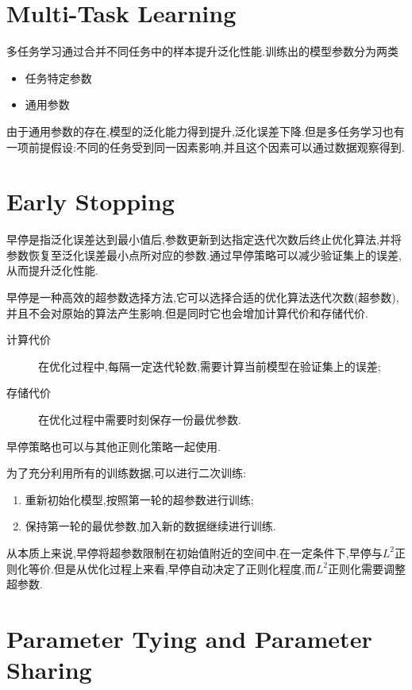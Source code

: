 \section{Multi-Task Learning}

多任务学习通过合并不同任务中的样本提升泛化性能.训练出的模型参数分为两类
\begin{itemize}
    \item 任务特定参数
    \item 通用参数
\end{itemize}

由于通用参数的存在,模型的泛化能力得到提升,泛化误差下降.但是多任务学习也有一项前提假设:不同的任务受到同一因素影响,并且这个因素可以通过数据观察得到.

\section{Early Stopping}

早停是指泛化误差达到最小值后,参数更新到达指定迭代次数后终止优化算法,并将参数恢复至泛化误差最小点所对应的参数.通过早停策略可以减少验证集上的误差,从而提升泛化性能.

早停是一种高效的超参数选择方法,它可以选择合适的优化算法迭代次数(超参数),并且不会对原始的算法产生影响.但是同时它也会增加计算代价和存储代价.
\begin{description}
    \item [计算代价]在优化过程中,每隔一定迭代轮数,需要计算当前模型在验证集上的误差;
    \item [存储代价]在优化过程中需要时刻保存一份最优参数.
\end{description}

早停策略也可以与其他正则化策略一起使用.

为了充分利用所有的训练数据,可以进行二次训练:
\begin{enumerate}
    \item 重新初始化模型,按照第一轮的超参数进行训练;
    \item 保持第一轮的最优参数,加入新的数据继续进行训练.
\end{enumerate}

从本质上来说,早停将超参数限制在初始值附近的空间中.在一定条件下,早停与$L^2$正则化等价.但是从优化过程上来看,早停自动决定了正则化程度,而$L^2$正则化需要调整超参数.

\section{Parameter Tying and Parameter Sharing}

